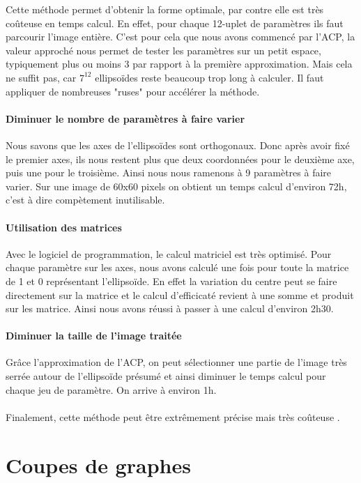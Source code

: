 \documentclass{article}
\begin{document}
Cette méthode permet d'obtenir la forme optimale, par contre elle est très coûteuse en temps calcul. En effet, pour chaque 12-uplet de paramètres ils faut parcourir l'image entière. C'est pour cela que nous avons commencé par l'ACP, la valeur approché nous permet de tester les paramètres sur un petit espace, typiquement plus ou moins 3 par rapport à la première approximation. Mais cela ne suffit pas, car $7^{12}$ ellipsoïdes reste beaucoup trop long à calculer. Il faut appliquer de nombreuses "ruses" pour accélérer la méthode.\\

\paragraph{Diminuer le nombre de paramètres à faire varier} Nous savons que les axes de l'ellipsoïdes sont orthogonaux. Donc après avoir fixé le premier axes, ils nous restent plus que deux coordonnées pour le deuxième axe, puis une pour le troisième. Ainsi nous nous ramenons à 9 paramètres à faire varier. Sur une image de 60x60 pixels on obtient un temps calcul d'environ 72h, c'est à dire compètement inutilisable.

\paragraph{Utilisation des matrices} Avec le logiciel de programmation, le calcul matriciel est très optimisé. Pour chaque paramètre sur les axes, nous avons calculé une fois pour toute la matrice de 1 et 0 représentant l'ellipsoïde. En effet la variation du centre peut se faire directement sur la matrice et le calcul d'efficicaté revient à une somme et produit sur les matrice. Ainsi nous avons réussi à passer à une calcul d'environ 2h30.

\paragraph{Diminuer la taille de l'image traitée} Grâce l'approximation de l'ACP, on peut sélectionner une partie de l'image très serrée autour de l'ellipsoïde présumé et ainsi diminuer le temps calcul pour chaque jeu de paramètre. On arrive à environ 1h.\\\\

Finalement, cette méthode peut être extrêmement précise mais très coûteuse .


\section{Coupes de graphes}
\end{document}
